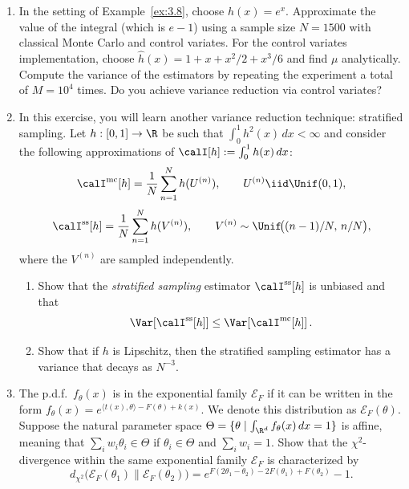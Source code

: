 \begin{enumerate}
\item[3.4] In the setting of Example~\ref{ex:3.8}, choose $h(x) = e^x$.
Approximate the value of the integral (which is $e - 1$) using a sample size
$N = 1500$ with classical Monte Carlo and control variates. For the control
variates implementation, choose $\hat{h}(x) = 1 + x + x^2/2 + x^3/6$ and find
$\mu$ analytically. Compute the variance of the estimators by repeating the
experiment a total of $M = 10^4$ times. Do you achieve variance reduction via
control variates?

\item[3.5] In this exercise, you will learn another variance reduction
technique: stratified sampling. Let $h : [0,1] \to \R$ be such that
$\int_0^1 h^2(x)\,dx < \infty$ and consider the following approximations of
$\calI[h] := \int_0^1 h(x)\,dx$:
\[
  \calI^{\mathrm{mc}}[h]
  = \frac{1}{N}\sum_{n=1}^{N} h(U^{(n)}),
  \qquad U^{(n)} \iid \Unif(0,1),
\]
\[
  \calI^{\mathrm{ss}}[h]
  = \frac{1}{N}\sum_{n=1}^{N} h(V^{(n)}),
  \qquad V^{(n)} \sim \Unif\!\bigl((n-1)/N,\, n/N\bigr),
\]
where the $V^{(n)}$ are sampled independently.
\begin{enumerate}
  \item[(a)] Show that the \emph{stratified sampling} estimator
             $\calI^{\mathrm{ss}}[h]$ is unbiased and that
             \[
               \Var\!\left[\calI^{\mathrm{ss}}[h]\right]
               \leq \Var\!\left[\calI^{\mathrm{mc}}[h]\right].
             \]
  \item[(b)] Show that if $h$ is Lipschitz, then the stratified sampling
             estimator has a variance that decays as $N^{-3}$.
\end{enumerate}

\item[3.6] The p.d.f.\ $f_\theta(x)$ is in the exponential family
$\mathcal{E}_F$ if it can be written in the form
$f_\theta(x) = e^{\langle t(x),\theta\rangle - F(\theta) + k(x)}$. We denote
this distribution as $\mathcal{E}_F(\theta)$. Suppose the natural parameter
space $\Theta = \{\theta \mid \int_{\R^d} f_\theta(x)\,dx = 1\}$ is affine,
meaning that $\sum_i w_i\theta_i \in \Theta$ if $\theta_i \in \Theta$ and
$\sum_i w_i = 1$. Show that the $\chi^2$-divergence within the same exponential
family $\mathcal{E}_F$ is characterized by
\[
  d_{\chi^2}\!\bigl(\mathcal{E}_F(\theta_1)\|\mathcal{E}_F(\theta_2)\bigr)
  = e^{F(2\theta_1 - \theta_2) - 2F(\theta_1) + F(\theta_2)} - 1.
\]


\end{enumerate}
